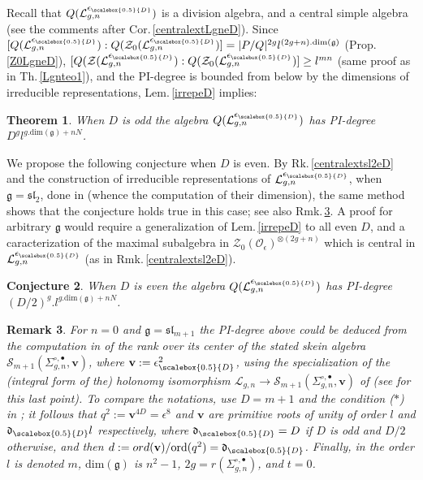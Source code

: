 \documentclass[11pt]{amsart}
\newtheorem{teo}{Theorem}[section]
\newtheorem{conj}[teo]{Conjecture}
\newtheorem{remark}[teo]{Remark}
\newcommand{\e}{\epsilon}
\newcommand{\Ll}{\mathcal{L}}
\newcommand{\Oo}{\mathcal{O}}
\newcommand{\eD}{\epsilon_{\scalebox{0.5}{D}}}
\newcommand{\D}{{\scalebox{0.5}{D}}}
\begin{document}
Recall that $Q(\Ll_{g,n}^{\eD})$ is a division algebra, and a central simple algebra (see the comments after Cor.\,\ref{centralextLgneD}). Since $[Q(\Ll_{g,n}^{\eD}):Q(\mathcal{Z}_0(\Ll_{g,n}^{\eD})] = \vert P/Q\vert^{2g}l^{(2g+n).\mathrm{dim}(\mathfrak{g})}$ (Prop.\,\ref{Z0LgneD}), $[Q(\mathcal{Z}(\Ll_{g,n}^{\eD}):Q(\mathcal{Z}_0(\Ll_{g,n}^{\eD})] \geq l^{mn}$ (same proof as in Th.\,\ref{Lgnteo1}), and the PI-degree is bounded from below by the dimensions of irreducible representations, Lem.\,\ref{irrepeD} implies:
\begin{teo}\label{Lgnteo1eD} When $D$ is odd the algebra $Q(\Ll_{g,n}^{\eD})$ has PI-degree $D^gl^{g.\mathrm{dim}(\mathfrak{g})+nN}$.
\end{teo}
We propose the following conjecture when $D$ is even. By Rk.\,\ref{centralextsl2eD} and the construction of irreducible representations of $\Ll_{g,n}^{\eD}$, when $\mathfrak{g}= \mathfrak{sl}_2$, done in \cite{BFRsl2} (whence the computation of their dimension), the same method shows that the conjecture holds true in this case; see also Rmk.\,\ref{rk:comparLW}. A proof for arbitrary $\mathfrak{g}$ would require a generalization of Lem.\,\ref{irrepeD} to all even $D$, and a caracterization of the maximal subalgebra in $\mathcal{Z}_0(\Oo_\e)^{\otimes (2g+n)}$ which is central in $\Ll_{g,n}^{\eD}$ (as in Rmk.\,\ref{centralextsl2eD}).
\begin{conj}\label{Lgnteo1eDconj} When $D$ is even the algebra $Q(\Ll_{g,n}^{\eD})$ has PI-degree $(D/2)^g.l^{g.\mathrm{dim}(\mathfrak{g})+nN}$.
\end{conj}
\begin{remark}\label{rk:comparLW}{\rm For $n=0$ and $\mathfrak{g}=\mathfrak{sl}_{m+1}$ the PI-degree above could be deduced from the computation in \cite[Thm.\,1.4]{KaruoWang} of the rank over its center of the stated skein algebra $\mathcal{S}_{m+1}(\Sigma_{g,n}^{\circ,\bullet},\mathbf{v})$, where $\mathbf{v}:=\eD^2$, using the specialization of the (integral form of the) holonomy isomorphism $\Ll_{g,n}\to \mathcal{S}_{m+1}(\Sigma_{g,n}^{\circ,\bullet},\mathbf{v})$ of \cite{BFR} (see \cite{BF} for this last point). To compare the notations, use $D=m+1$ and the condition ($*$) in \cite[\S 2.1]{KaruoWang}; it follows that $q^2 := \mathbf{v}^{4D} = \e^8$ and $\mathbf{v}$ are primitive roots of unity of order $l$ and $\mathfrak{d}_\D l$ respectively, where $\mathfrak{d}_\D =D$ if $D$ is odd and $D/2$ otherwise, and then $d:={ord}(\mathbf{v})/{\rm ord}(q^2) = \mathfrak{d}_\D$. Finally, in \cite[Thm.\,1.4]{KaruoWang} the order $l$ is denoted $m$, $\mathrm{dim}(\mathfrak{g})$ is $n^2-1$, $2g = r(\Sigma_{g,n}^{\circ,\bullet})$, and $t=0$.}
\end{remark}
\end{document}
